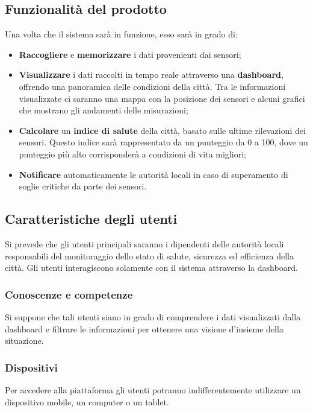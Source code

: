
\subsection{Funzionalità del prodotto}
Una volta che il sistema sarà in funzione, esso sarà in grado di:
\begin{itemize}
	\item \textbf{Raccogliere} e \textbf{memorizzare} i dati provenienti dai sensori;
	\item \textbf{Visualizzare} i dati raccolti in tempo reale attraverso una \textbf{dashboard}, offrendo una panoramica delle condizioni della città.
	      Tra le informazioni visualizzate ci saranno una mappa con la posizione dei sensori e alcuni grafici che mostrano gli andamenti delle misurazioni;
	\item \textbf{Calcolare} un \textbf{indice di salute} della città, basato sulle ultime rilevazioni dei sensori. Questo indice sarà rappresentato da un punteggio da 0 a 100, dove un punteggio più alto corrisponderà a condizioni di vita migliori;
	\item \textbf{Notificare} automaticamente le autorità locali in caso di superamento di soglie critiche da parte dei sensori.
\end{itemize}

\subsection{Caratteristiche degli utenti}
Si prevede che gli utenti principali saranno i dipendenti delle autorità locali responsabili
del monitoraggio dello stato di salute, sicurezza ed efficienza della città.
Gli utenti interagiscono solamente con il sistema attraverso la dashboard.

\subsubsection{Conoscenze e competenze}
Si suppone che tali utenti siano in grado di comprendere i dati visualizzati dalla dashboard e filtrare le informazioni
per ottenere una visione d'insieme della situazione.

\subsubsection{Dispositivi}
Per accedere alla piattaforma gli utenti potranno indifferentemente utilizzare un dispositivo mobile, un computer o un tablet.






